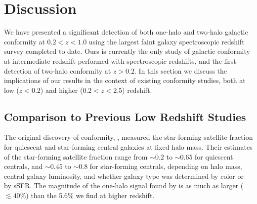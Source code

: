 
\section{Discussion}\label{sec:discussion}


We have presented a significant detection of both one-halo and two-halo galactic conformity 
at ${0.2 < z < 1.0}$ using the largest faint galaxy spectroscopic redshift survey completed to date.  
Ours is currently the only study of galactic conformity at intermediate redshift performed with 
spectroscopic redshifts, and the first detection of two-halo conformity at $z>0.2$.
In this section we discuss the implications of our results in the context of existing conformity 
studies, both at low ($z<0.2$) and higher (${0.2<z<2.5}$) redshift.



\subsection{Comparison to Previous Low Redshift Studies}\label{sec:compare_low}


The original discovery of conformity, \citet{Weinmann06}, measured the star-forming satellite fraction for quiescent and
star-forming central galaxies at fixed halo mass.
Their estimates of the star-forming satellite fraction range from $\sim0.2$ to $\sim0.65$ for quiescent centrals, and $\sim0.45$ to $\sim0.8$ for star-forming
centrals, depending on halo mass, central galaxy luminosity, and whether galaxy type was determined by color or by sSFR.
The magnitude of the one-halo signal found by \citet{Weinmann06} is as much as larger ($\lesssim40$\%) than the 5.6\% 
we find at higher redshift.

